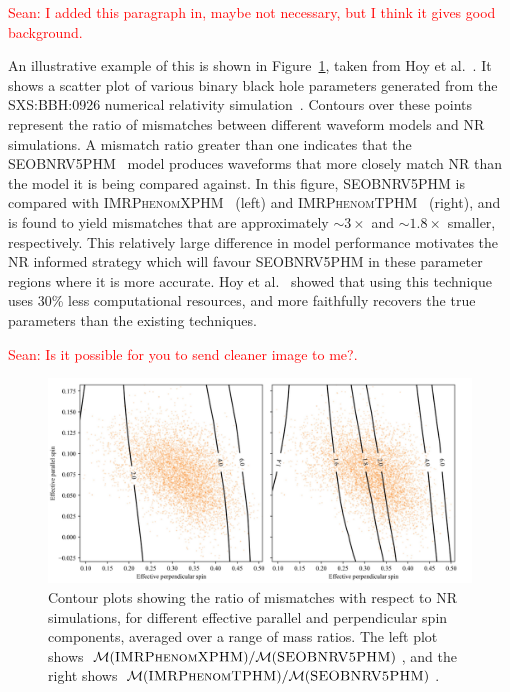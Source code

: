 \documentclass[10pt]{article}
\newcommand{\Sean}[1]{{\textcolor{red}{{Sean: #1}} }}
\begin{document}
\Sean{I added this paragraph in, maybe not necessary, but I think it gives good background.}

%
An illustrative example of this is shown in Figure~\ref{fig:projectmotivation}, taken from Hoy et al.~\cite{Ogpaper}. It shows a scatter plot of various binary black hole parameters generated from the \textsc{SXS:BBH:0926} numerical relativity simulation~\cite{NRsimulation}. 
Contours over these points represent the ratio of mismatches between different waveform models and NR simulations.
A mismatch ratio greater than one indicates that the \textsc{SEOBNRV5PHM}~\cite{bestNRfitS} model produces waveforms that more closely match NR than the model it is being compared against.
In this figure, \textsc{SEOBNRV5PHM} is compared with \textsc{IMRPhenomXPHM}~\cite{NRfitMP} (left) and \textsc{IMRPhenomTPHM}~\cite{NRfitMT} (right), 
and is found to yield mismatches that are approximately \( \sim 3\times \) and \( \sim 1.8\times \) smaller, respectively.
This relatively large difference in model performance motivates the NR informed strategy
which will favour \textsc{SEOBNRV5PHM} in these parameter regions where it is more accurate. 
Hoy et al.~\cite{Ogpaper} showed that using this technique uses 30\% less computational resources, and more faithfully recovers the true parameters than
the existing techniques.
%

\Sean{Is it possible for you to send cleaner image to me?.}
\begin{figure}[H]
    \centering
    \includegraphics[width=\textwidth]{LatexPlots/Sarppaperprojectmotivation.png}
    \caption{Contour plots showing the ratio of mismatches with respect to NR simulations, for different effective parallel and perpendicular spin components, averaged over a range of mass ratios. 
    The left plot shows \( \mathcal{M}(\textsc{IMRPhenomXPHM}) / \mathcal{M}(\textsc{SEOBNRV5PHM}) \), and the right shows \( \mathcal{M}(\textsc{IMRPhenomTPHM}) / \mathcal{M}(\textsc{SEOBNRV5PHM}) \).}
    \label{fig:projectmotivation}
\end{figure}
\end{document}

